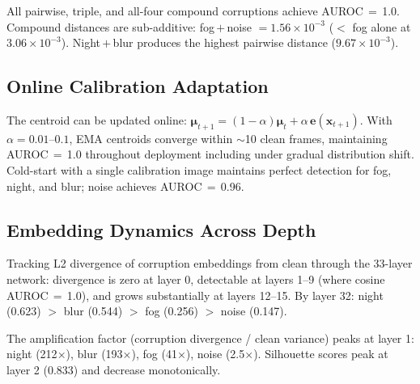 \documentclass[11pt]{article}
\newcommand{\bx}{\mathbf{x}}
\newcommand{\be}{\mathbf{e}}
\newcommand{\bmu}{\boldsymbol{\mu}}
\begin{document}
All pairwise, triple, and all-four compound corruptions achieve AUROC\,$=$\,1.0.
Compound distances are sub-additive: fog\,$+$\,noise $= 1.56 \times 10^{-3}$ ($<$ fog alone at $3.06 \times 10^{-3}$).
Night\,$+$\,blur produces the highest pairwise distance ($9.67 \times 10^{-3}$).

\subsection{Online Calibration Adaptation}
\label{app:online}

The centroid can be updated online: $\bmu_{t+1} = (1 - \alpha) \bmu_t + \alpha \, \be(\bx_{t+1})$.
With $\alpha = 0.01\text{--}0.1$, EMA centroids converge within $\sim$10 clean frames, maintaining AUROC\,$=$\,1.0 throughout deployment including under gradual distribution shift.
Cold-start with a single calibration image maintains perfect detection for fog, night, and blur; noise achieves AUROC\,$=$\,0.96.

\subsection{Embedding Dynamics Across Depth}
\label{app:dynamics}

Tracking L2 divergence of corruption embeddings from clean through the 33-layer network: divergence is zero at layer 0, detectable at layers 1--9 (where cosine AUROC\,$=$\,1.0), and grows substantially at layers 12--15.
By layer 32: night (0.623) $>$ blur (0.544) $>$ fog (0.256) $>$ noise (0.147).

The amplification factor (corruption divergence / clean variance) peaks at layer 1: night (212$\times$), blur (193$\times$), fog (41$\times$), noise (2.5$\times$).
Silhouette scores peak at layer 2 (0.833) and decrease monotonically.
\end{document}
